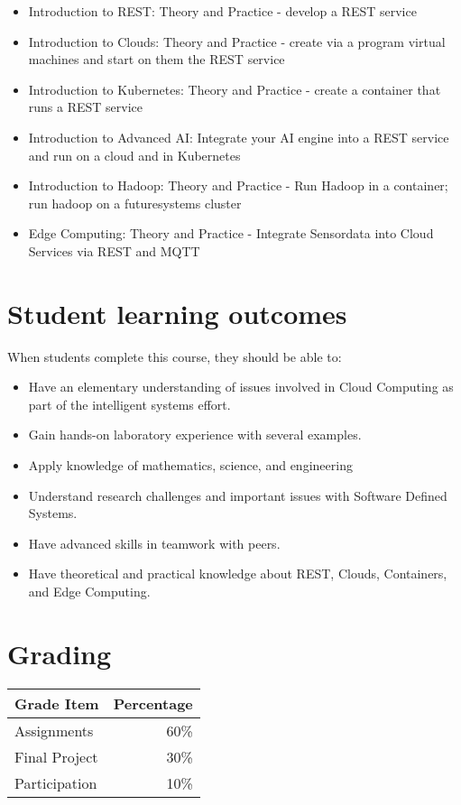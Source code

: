 \begin{itemize}
\item Introduction to REST: Theory and Practice - develop a REST service
\item Introduction to Clouds: Theory and Practice - create via a
  program virtual machines and start on them the REST service
\item Introduction to Kubernetes: Theory and Practice - create a
  container that runs a REST service
\item Introduction to Advanced AI: Integrate your AI engine into a
  REST service and run on a cloud and in Kubernetes 
\item Introduction to Hadoop: Theory and Practice - Run Hadoop in a
  container; run hadoop on a futuresystems cluster
\item Edge Computing: Theory and Practice - Integrate Sensordata into
  Cloud Services via REST and MQTT
\end{itemize}


\section{Student learning outcomes}

When students complete this course, they should be able to:

\begin{itemize}
\item Have an elementary understanding of issues involved in Cloud
  Computing as part of the intelligent systems effort.
\item Gain hands-on laboratory experience with several examples.
\item Apply knowledge of mathematics, science, and engineering
\item Understand research challenges and important issues with
  Software Defined Systems.
\item	Have advanced skills in teamwork with peers.
\item Have theoretical and practical knowledge about REST, Clouds,
  Containers, and Edge Computing.
\end{itemize}


\section{Grading}

\begin{tabular}{lr}
  Grade Item	  & Percentage\\
  \toprule
  Assignments	  & 60\%\\
  Final Project	& 30\%\\
  Participation	& 10\%\\
  \bottomrule
\end{tabular}


